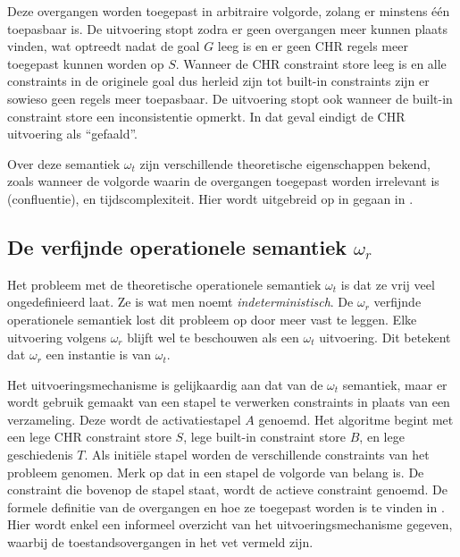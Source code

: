 Deze overgangen worden toegepast in arbitraire volgorde, zolang er minstens \'e\'en toepasbaar is. De uitvoering stopt zodra er geen overgangen meer kunnen plaats vinden, wat optreedt nadat de goal $G$ leeg is en er geen CHR regels meer toegepast kunnen worden op $S$. Wanneer de CHR constraint store leeg is en alle constraints in de originele goal dus herleid zijn tot built-in constraints zijn er sowieso geen regels meer toepasbaar. De uitvoering stopt ook wanneer de built-in constraint store een inconsistentie opmerkt. In dat geval eindigt de CHR uitvoering als ``gefaald''.

Over deze semantiek $\omega_t$ zijn verschillende theoretische eigenschappen bekend, zoals wanneer de volgorde waarin de overgangen toegepast worden irrelevant is (confluentie), en tijdscomplexiteit. Hier wordt uitgebreid op in gegaan in \cite{tomsphdthesis}.

\subsection{De verfijnde operationele semantiek $\omega_r$}

Het probleem met de theoretische operationele semantiek $\omega_t$ is dat ze vrij veel ongedefinieerd laat. Ze is wat men noemt {\em indeterministisch}. De $\omega_r$ verfijnde operationele semantiek lost dit probleem op door meer vast te leggen. Elke uitvoering volgens $\omega_r$ blijft wel te beschouwen als een $\omega_t$ uitvoering. Dit betekent dat $\omega_r$ een instantie is van $\omega_t$. 

Het uitvoeringsmechanisme is gelijkaardig aan dat van de $\omega_t$ semantiek, maar er wordt gebruik gemaakt van een stapel te verwerken constraints in plaats van een verzameling. Deze wordt de activatiestapel $A$ genoemd. Het algoritme begint met een lege CHR constraint store $S$, lege built-in constraint store $B$, en lege geschiedenis $T$. Als initi\"ele stapel worden de verschillende constraints van het probleem genomen. Merk op dat in een stapel de volgorde van belang is. De constraint die bovenop de stapel staat, wordt de actieve constraint genoemd. De formele definitie van de overgangen en hoe ze toegepast worden is te vinden in \cite{tomsphdthesis}. Hier wordt enkel een informeel overzicht van het uitvoeringsmechanisme gegeven, waarbij de toestandsovergangen in het vet vermeld zijn.

